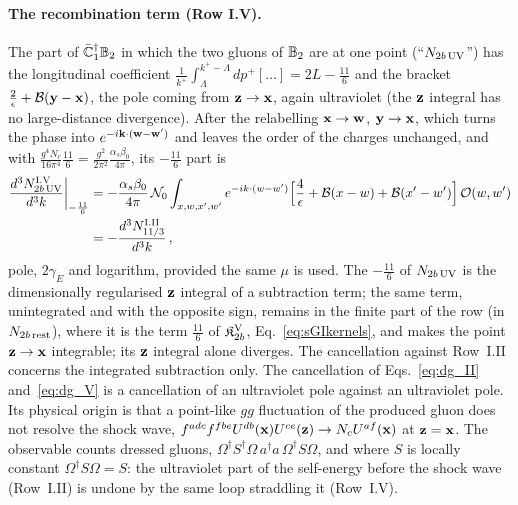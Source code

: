 \paragraph{The recombination term (Row I.V).} The part of $\bar{\mathbb{C}}_1^\dagger\mathbb{B}_2$ in which the two gluons of $\mathbb{B}_2$ are at one point (``$N_{2b\,\rm UV}$'') has the longitudinal coefficient $\frac{1}{k^+}\int_\Lambda^{k^+-\Lambda}dp^+[\dots]=2L-\frac{11}{6}$ and the bracket $\frac2\epsilon+\mathcal B(\mathbf{y}-\mathbf{x})$, the pole coming from $\mathbf{z}\to\mathbf{x}$, again ultraviolet (the $\mathbf{z}$ integral has no large-distance divergence). After the relabelling $\mathbf{x}\to\mathbf{w}$, $\mathbf{y}\to\mathbf{x}$, which turns the phase into $e^{-i\mathbf{k}\cdot(\mathbf{w}-\mathbf{w}')}$ and leaves the order of the charges unchanged, and with $\frac{g^4N_c}{16\pi^4}\frac{11}{6}=\frac{g^2}{2\pi^2}\frac{\alpha_s\beta_0}{4\pi}$, its $-\frac{11}{6}$ part is
\begin{align}\label{eq:dg_V}
\frac{d^3N^{\rm I.V}_{2b\,\rm UV}}{d^3k}\bigg|_{-\frac{11}{6}}&=-\frac{\alpha_s\beta_0}{4\pi}\,\mathcal N_0\int_{x,w,x',w'}e^{-ik\cdot(w-w')}\Big[\frac{4}{\epsilon}+\mathcal B(x-w)+\mathcal B(x'-w')\Big]\,\mathcal O(w,w')\notag\\&=-\frac{d^3N^{\rm I.II}_{11/3}}{d^3k}\,,
\end{align}
pole, $2\gamma_E$ and logarithm, provided the same $\mu$ is used. The $-\frac{11}{6}$ of $N_{2b\,\rm UV}$ is the dimensionally regularised $\mathbf{z}$ integral of a subtraction term; the same term, unintegrated and with the opposite sign, remains in the finite part of the row (in $N_{2b\,\rm rest}$), where it is the term $\frac{11}{6}$ of $\mathfrak K^{\rm V}_{2b}$, Eq.~\eqref{eq:sGIkernels}, and makes the point $\mathbf{z}\to\mathbf{x}$ integrable; its $\mathbf{z}$ integral alone diverges. The cancellation against Row~I.II concerns the integrated subtraction only. The cancellation of Eqs.~\eqref{eq:dg_II} and~\eqref{eq:dg_V} is a cancellation of an ultraviolet pole against an ultraviolet pole. Its physical origin is that a point-like $gg$ fluctuation of the produced gluon does not resolve the shock wave, $f^{adc}f^{fbe}U^{db}(\mathbf{x})U^{ce}(\mathbf{z})\to N_cU^{af}(\mathbf{x})$ at $\mathbf{z}=\mathbf{x}$. The observable counts dressed gluons, $\Omega^\dagger S^\dagger\Omega\,a^\dagger a\,\Omega^\dagger S\Omega$, and where $S$ is locally constant $\Omega^\dagger S\Omega=S$: the ultraviolet part of the self-energy before the shock wave (Row~I.II) is undone by the same loop straddling it (Row~I.V). 

